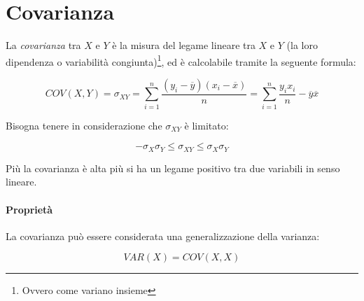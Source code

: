 \section{Covarianza}

La \textit{covarianza} tra $X$ e $Y$ \`e la misura del legame lineare tra $X$ e 
$Y$ (la loro dipendenza o variabilit\`a congiunta)\footnote{Ovvero come 
variano insieme}, ed \`e calcolabile tramite la seguente formula:

\[ COV(X,Y) = \sigma_{XY} = \sum_{i=1}^n \frac{(y_i - \overline{y}) (x_i - 
\overline{x})}{n} = \sum_{i=1}^n \frac{y_i x_i}{n} - \overline{y} \overline{x} 
\]

Bisogna tenere in considerazione che $\sigma_{XY}$ \`e limitato:

\[ -\sigma_X \sigma_Y \le \sigma_{XY} \le \sigma_X \sigma_Y \]

Pi\`u la covarianza \`e alta pi\`u si ha un legame positivo tra due variabili 
in senso lineare.

\paragraph*{Propriet\`a}
La covarianza pu\`o essere considerata una generalizzazione della varianza:

\[ VAR(X) = COV(X,X)  \]
